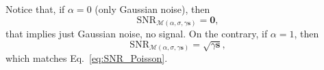Notice that, if $\alpha=0$ (only Gaussian noise), then
\begin{equation}
  \text{SNR}_{\mathcal{M}(\alpha,\sigma,\gamma\mathbf{s})} = \mathbf{0},
\end{equation}
that implies just Gaussian noise, no signal. On the contrary, if
$\alpha=1$, then
\begin{equation}
  \text{SNR}_{\mathcal{M}(\alpha,\sigma,\gamma\mathbf{s})} = \sqrt{\gamma\mathbf{s}},
\end{equation}
which matches Eq.~\ref{eq:SNR_Poisson}.

\begin{comment}
In particular, for $\mathbf{s}=\mathbf{0}$ (a constant signal
with zeros), Equations \ref{eq:E_MPG} and \ref{eq:V_MPG}
become
\begin{equation}
  \mathbb{E}(\mathbf{\hat{\mathbf{s}}}) = 0,
\end{equation}
and
\begin{equation}
  \mathbb{V}(\hat{\mathbf{s}}) = (1-\alpha)\sigma^2,
\end{equation}
and for $\mathbf{s}=\mathbf{1}$ (a constant signal with ones)
\begin{equation}
  \mathbb{E}(\hat{\mathbf{s}}) = \mathbb{E}(\mathbf{1}) = 1,
\end{equation}
and
\begin{equation}
  \mathbb{V}(\hat{\mathbf{s}}) = (1-\alpha)\sigma^2 + \alpha/\gamma.
\end{equation}
\end{comment}

    

